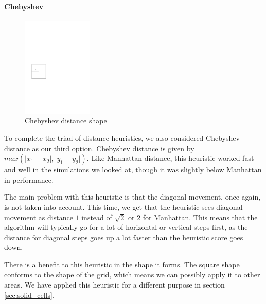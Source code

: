\paragraph{Chebyshev}
\label{sec:chebyshev}
\begin{figure}
\includegraphics[width=0.30\textwidth]{images/chebyshev_unit.pdf}
\caption{Chebyshev distance shape}
\end{figure}
To complete the triad of distance heuristics, we also considered Chebyshev distance as our third option. Chebyshev distance is given by $max(\lvert x_1 - x_2 \rvert, \lvert y_1 - y_2 \rvert)$. Like Manhattan distance, this heuristic worked fast and well in the simulations we looked at, though it was slightly below Manhattan in performance.

The main problem with this heuristic is that the diagonal movement, once again, is not taken into account. This time, we get that the heuristic sees diagonal movement as distance $1$ instead of $\sqrt{2}$ or $2$ for Manhattan. This means that the algorithm will typically go for a lot of horizontal or vertical steps first, as the distance for diagonal steps goes up a lot faster than the heuristic score goes down.

There is a benefit to this heuristic in the shape it forms. The square shape conforms to the shape of the grid, which means we can possibly apply it to other areas. We have applied this heuristic for a different purpose in section \ref{sec:solid_cells}.

\clearpage
